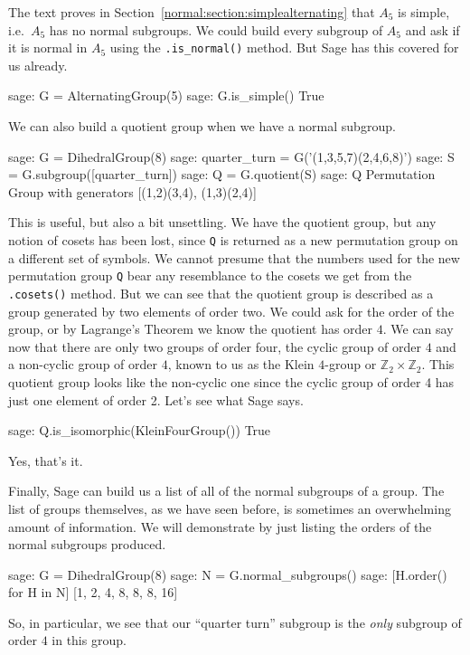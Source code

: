 %
The text proves in Section~\ref{normal:section:simplealternating} that $A_5$ is simple, i.e.\ $A_5$ has no normal subgroups.  We could build every subgroup of $A_5$ and ask if it is normal in $A_5$ using the \verb?.is_normal()? method.  But Sage has this covered for us already.
%
\begin{sageexample}
sage: G = AlternatingGroup(5)
sage: G.is_simple()
True
\end{sageexample}
%
We can also build a quotient group when we have a normal subgroup.
%
\begin{sageexample}
sage: G = DihedralGroup(8)
sage: quarter_turn = G('(1,3,5,7)(2,4,6,8)')
sage: S = G.subgroup([quarter_turn])
sage: Q = G.quotient(S)
sage: Q
Permutation Group with generators [(1,2)(3,4), (1,3)(2,4)]
\end{sageexample}
%
This is useful, but also a bit unsettling.  We have the quotient group, but any notion of cosets has been lost, since \verb?Q? is returned as a new permutation group on a different set of symbols.  We cannot presume that the numbers used for the new permutation group \verb?Q? bear any resemblance to the cosets we get from the \verb?.cosets()? method.  But we can see that the quotient group is described as a group generated by two elements of order two.  We could ask for the order of the group, or by Lagrange's Theorem we know the quotient has order $4$.  We can say now that there are only two groups of order four, the cyclic group of order $4$ and a non-cyclic group of order $4$, known to us as the Klein $4$-group or ${\mathbb Z}_2\times{\mathbb Z}_2$.  This quotient group looks like the non-cyclic one since the cyclic group of order 4 has just one element of order 2.  Let's see what Sage says.
%
\begin{sageexample}
sage: Q.is_isomorphic(KleinFourGroup())
True
\end{sageexample}
%
Yes, that's it.\par
%
Finally, Sage can build us a list of all of the normal subgroups of a group.  The list of groups themselves, as we have seen before, is sometimes an overwhelming amount of information.  We will demonstrate by just listing the orders of the normal subgroups produced.
%
\begin{sageexample}
sage: G = DihedralGroup(8)
sage: N = G.normal_subgroups()
sage: [H.order() for H in N]
[1, 2, 4, 8, 8, 8, 16]
\end{sageexample}
%
So, in particular, we see that our ``quarter turn'' subgroup is the \emph{only} subgroup of order $4$ in this group.
%
